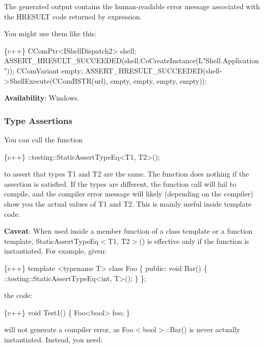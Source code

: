 The generated output contains the human-\/readable error message associated with the {\ttfamily H\+R\+E\+S\+U\+LT} code returned by {\ttfamily expression}.

You might use them like this\+:


\begin{DoxyCode}
\{c++\}
CComPtr<IShellDispatch2> shell;
ASSERT\_HRESULT\_SUCCEEDED(shell.CoCreateInstance(L"Shell.Application"));
CComVariant empty;
ASSERT\_HRESULT\_SUCCEEDED(shell->ShellExecute(CComBSTR(url), empty, empty, empty, empty));
\end{DoxyCode}


{\bfseries Availability}\+: Windows.

\subsubsection*{Type Assertions}

You can call the function


\begin{DoxyCode}
\{c++\}
::testing::StaticAssertTypeEq<T1, T2>();
\end{DoxyCode}


to assert that types {\ttfamily T1} and {\ttfamily T2} are the same. The function does nothing if the assertion is satisfied. If the types are different, the function call will fail to compile, and the compiler error message will likely (depending on the compiler) show you the actual values of {\ttfamily T1} and {\ttfamily T2}. This is mainly useful inside template code.

{\bfseries Caveat}\+: When used inside a member function of a class template or a function template, {\ttfamily Static\+Assert\+Type\+Eq$<$T1, T2$>$()} is effective only if the function is instantiated. For example, given\+:


\begin{DoxyCode}
\{c++\}
template <typename T> class Foo \{
 public:
  void Bar() \{ ::testing::StaticAssertTypeEq<int, T>(); \}
\};
\end{DoxyCode}


the code\+:


\begin{DoxyCode}
\{c++\}
void Test1() \{ Foo<bool> foo; \}
\end{DoxyCode}


will not generate a compiler error, as {\ttfamily Foo$<$bool$>$\+::\+Bar()} is never actually instantiated. Instead, you need\+:


